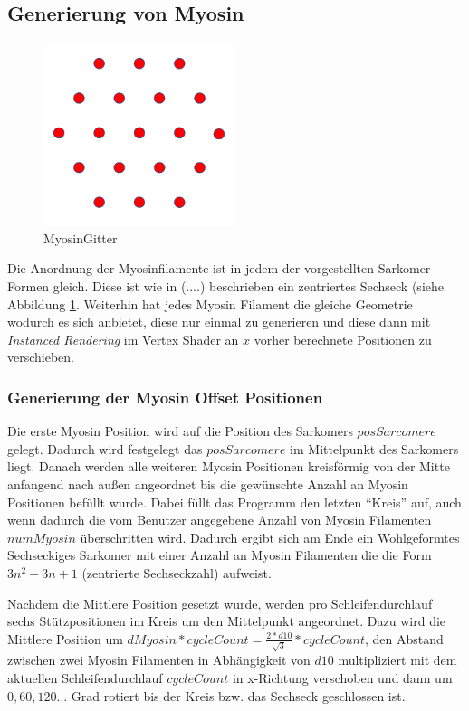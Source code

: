 \documentclass[a4paper,m]{cgBA}
\begin{document}
\subsection{Generierung von Myosin}

\begin{figure}[h]
\center
\includegraphics[width=0.5\textwidth]{Graphics/MyosinGitter.pdf}
\caption{MyosinGitter}
\label{fig:MyosinGitter}
\end{figure}

Die Anordnung der Myosinfilamente ist in jedem der vorgestellten Sarkomer Formen gleich. Diese ist wie in (....) beschrieben ein zentriertes Sechseck (siehe Abbildung \ref{fig:MyosinGitter}. Weiterhin hat jedes Myosin Filament die gleiche Geometrie wodurch es sich anbietet, diese nur einmal zu generieren und diese dann mit \textit{Instanced Rendering} im Vertex Shader an \(x\) vorher berechnete Positionen zu verschieben. 

\subsubsection{Generierung der Myosin Offset Positionen}

Die erste Myosin Position wird auf die Position des Sarkomers \(posSarcomere\) gelegt. Dadurch wird festgelegt das \(posSarcomere\) im Mittelpunkt des Sarkomers liegt. Danach werden alle weiteren Myosin Positionen kreisförmig von der Mitte anfangend nach außen angeordnet bis die gewünschte Anzahl an Myosin Positionen befüllt wurde. Dabei füllt das Programm den letzten ``Kreis'' auf, auch wenn dadurch die vom Benutzer angegebene Anzahl von Myosin Filamenten \(numMyosin\) überschritten wird. Dadurch ergibt sich am Ende ein Wohlgeformtes Sechseckiges Sarkomer mit einer Anzahl an Myosin Filamenten die die Form \(3n^2 -3n +1\) (zentrierte Sechseckzahl) aufweist. 

Nachdem die Mittlere Position gesetzt wurde, werden pro Schleifendurchlauf sechs Stützpositionen im Kreis um den Mittelpunkt angeordnet. Dazu wird die Mittlere Position um \(dMyosin * cycleCount = \frac{2 * d10}{\sqrt{3}} * cycleCount\), den Abstand zwischen zwei Myosin Filamenten in Abhängigkeit von \(d10\) multipliziert mit dem aktuellen Schleifendurchlauf \(cycleCount\) in x-Richtung verschoben und dann um \(0, 60, 120...\) Grad rotiert bis der Kreis bzw. das Sechseck geschlossen ist.	
\end{document}
